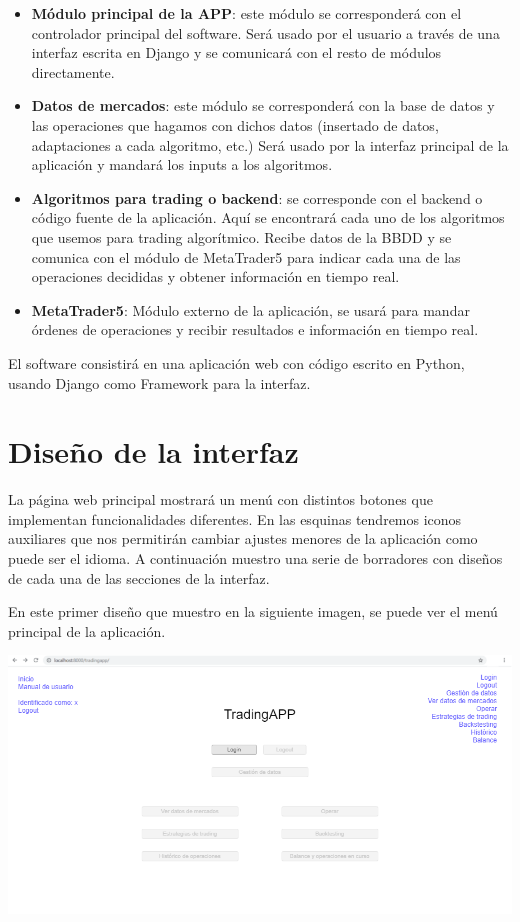 \begin{titlepage}
\begin{itemize}
	\item \textbf{Módulo principal de la APP}: este módulo se corresponderá con el controlador principal del software. Será usado por el usuario a través de una interfaz escrita en Django y se comunicará con el resto de módulos directamente.
	\item \textbf{Datos de mercados}: este módulo se corresponderá con la base de datos y las operaciones que hagamos con dichos datos (insertado de datos, adaptaciones a cada algoritmo, etc.) Será usado por la interfaz principal de la aplicación y mandará los inputs a los algoritmos.
	\item \textbf{Algoritmos para trading o backend}: se corresponde con el backend o código fuente de la aplicación. Aquí se encontrará cada uno de los algoritmos que usemos para trading algorítmico. Recibe datos de la BBDD y se comunica con el módulo de MetaTrader5 para indicar cada una de las operaciones decididas y obtener información en tiempo real.
	\item \textbf{MetaTrader5}: Módulo externo de la aplicación, se usará para mandar órdenes de operaciones y recibir resultados e información en tiempo real.
\end{itemize}

El software consistirá en una aplicación web con código escrito en Python, usando Django como Framework para la interfaz.


\section{Diseño de la interfaz}

La página web principal mostrará un menú con distintos botones que implementan funcionalidades diferentes. En las esquinas tendremos iconos auxiliares que nos permitirán cambiar ajustes menores de la aplicación como puede ser el idioma. A continuación muestro una serie de borradores con diseños de cada una de las secciones de la interfaz.\newline

En este primer diseño que muestro en la siguiente imagen, se puede ver el menú principal de la aplicación.\newline

\includegraphics[width=1.2\textwidth]{imagenes/menu_principal}\\[0.1cm]


\end{titlepage}
